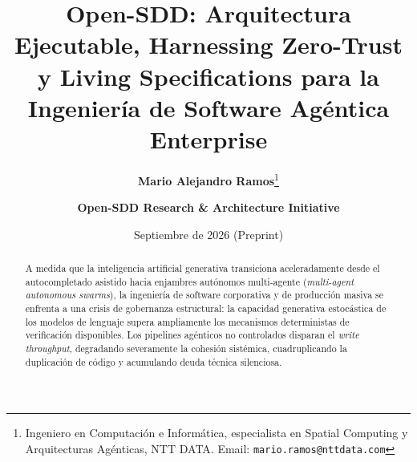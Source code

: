 \documentclass[11pt,a4paper]{article}
\title{\textbf{Open-SDD: Arquitectura Ejecutable, Harnessing Zero-Trust y Living Specifications para la Ingeniería de Software Agéntica Enterprise}}
\author{
    \textbf{Mario Alejandro Ramos}\thanks{Ingeniero en Computación e Informática, especialista en Spatial Computing y Arquitecturas Agénticas, NTT DATA. Email: \texttt{mario.ramos@nttdata.com}}
    \and
    \textbf{Open-SDD Research \& Architecture Initiative}
}
\date{Septiembre de 2026 (Preprint)}
\begin{document}
\maketitle

\begin{abstract}
A medida que la inteligencia artificial generativa transiciona aceleradamente desde el autocompletado asistido hacia enjambres autónomos multi-agente (\textit{multi-agent autonomous swarms}), la ingeniería de software corporativa y de producción masiva se enfrenta a una crisis de gobernanza estructural: la capacidad generativa estocástica de los modelos de lenguaje supera ampliamente los mecanismos deterministas de verificación disponibles. Los pipelines agénticos no controlados disparan el \textit{write throughput}, degradando severamente la cohesión sistémica, cuadruplicando la duplicación de código y acumulando deuda técnica silenciosa.


\end{abstract}
\end{document}

